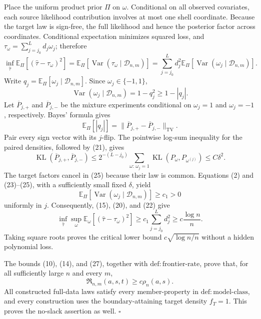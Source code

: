 Place the uniform product prior \(\Pi\) on \(\omega\).  Conditional on all observed covariates, each source likelihood contribution involves at most one shell coordinate.  Because the target law is sign-free, the full likelihood and hence the posterior factor across coordinates.  Conditional expectation minimizes squared loss, and \(\tau_\omega=\sum_{j=j_0}^Ld_j\omega_j\); therefore
\[
 \inf_{\widehat\tau}
 \mathbb E_\Pi[(\widehat\tau-\tau_\omega)^2]
 =\mathbb E_\Pi[\operatorname{Var}(\tau_\omega\mid\mathcal D_{n,m})]
 =\sum_{j=j_0}^Ld_j^2
   \mathbb E_\Pi[\operatorname{Var}(\omega_j\mid\mathcal D_{n,m})].
\tag{22}
\]
Write \(q_j=\mathbb E_\Pi[\omega_j\mid\mathcal D_{n,m}]\).  Since \(\omega_j\in\{-1,1\}\),
\[
 \operatorname{Var}(\omega_j\mid\mathcal D_{n,m})
 =1-q_j^2\ge1-|q_j|.
\tag{23}
\]
Let \(\overline P_{j,+}\) and \(\overline P_{j,-}\) be the mixture experiments conditional on \(\omega_j=1\) and \(\omega_j=-1\), respectively.  Bayes' formula gives
\[
 \mathbb E_\Pi[|q_j|]
 =\lVert\overline P_{j,+}-\overline P_{j,-}\rVert_{\mathrm{TV}}.
\tag{24}
\]
Pair every sign vector with its \(j\)-flip.  The pointwise log-sum inequality for the paired densities, followed by (21), gives
\[
 \operatorname{KL}(\overline P_{j,+},\overline P_{j,-})
 \le 2^{-(L-j_0)}
 \sum_{\omega:\,\omega_j=1}
 \operatorname{KL}(P_\omega,P_{\omega^{(j)}})
 \le C\delta^2.
\tag{25}
\]
The target factors cancel in (25) because their law is common.  Equations (2) and (23)--(25), with a sufficiently small fixed \(\delta\), yield
\[
 \mathbb E_\Pi[\operatorname{Var}
   (\omega_j\mid\mathcal D_{n,m})]
 \ge c_1>0
\tag{26}
\]
uniformly in \(j\).  Consequently, (15), (20), and (22) give
\[
 \inf_{\widehat\tau}\sup_\omega
 \mathbb E_\omega[(\widehat\tau-\tau_\omega)^2]
 \ge c_1\sum_{j=j_0}^Ld_j^2
 \ge c\frac{\log n}{n}.
\tag{27}
\]
Taking square roots proves the critical lower bound \(c\sqrt{\log n/n}\) without a hidden polynomial loss.

The bounds (10), (14), and (27), together with \(\mathrm{def:frontier\text{-}rate}\), prove that, for all sufficiently large \(n\) and every \(m\),
\[
 \mathfrak R_{n,m}(a,s,t)\ge c\rho_n(a,s).
\]
All constructed full-data laws satisfy every member-property in \(\mathrm{def:model\text{-}class}\), and every construction uses the boundary-attaining target density \(f_T=1\).  This proves the no-slack assertion as well. \(\square\)
